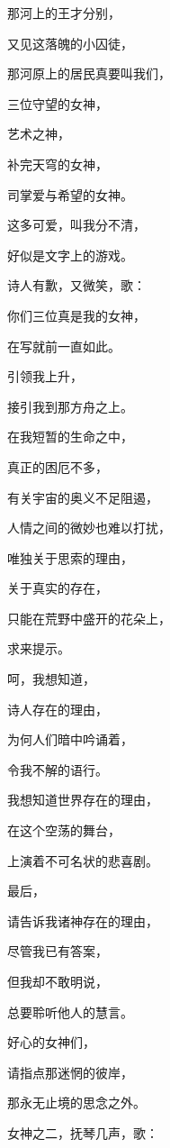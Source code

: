 \documentclass[UTF8]{article}
\begin{document}
\par 那河上的王才分别，
\par 又见这落魄的小囚徒，
\par 那河原上的居民真要叫我们，
\par 三位守望的女神，
\par 艺术之神，
\par 补完天穹的女神，
\par 司掌爱与希望的女神。
\par 这多可爱，叫我分不清，
\par 好似是文字上的游戏。
\\[0.6cm]
\par 诗人有歉，又微笑，歌：
\\[0.6cm]
\par 你们三位真是我的女神，
\par 在写就前一直如此。
\par 引领我上升，
\par 接引我到那方舟之上。
\par 在我短暂的生命之中，
\par 真正的困厄不多，
\par 有关宇宙的奥义不足阻遏，
\par 人情之间的微妙也难以打扰，
\par 唯独关于思索的理由，
\par 关于真实的存在，
\par 只能在荒野中盛开的花朵上，
\par 求来提示。
\par 呵，我想知道，
\par 诗人存在的理由，
\par 为何人们暗中吟诵着，
\par 令我不解的语行。
\par 我想知道世界存在的理由，
\par 在这个空荡的舞台，
\par 上演着不可名状的悲喜剧。
\par 最后，
\par 请告诉我诸神存在的理由，
\par 尽管我已有答案，
\par 但我却不敢明说，
\par 总要聆听他人的慧言。
\par 好心的女神们，
\par 请指点那迷惘的彼岸，
\par 那永无止境的思念之外。
\\[0.6cm]
\par 女神之二，抚琴几声，歌：
\end{document}
